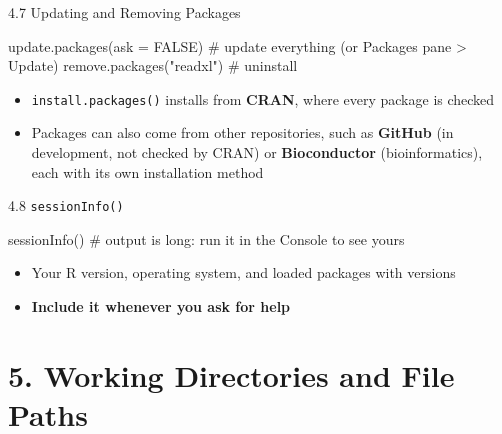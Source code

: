 \documentclass[
  ignorenonframetext,
  aspectratio=169,
]{beamer}
\newenvironment{Shaded}{\begin{snugshade}}{\end{snugshade}}
\newcommand{\AttributeTok}[1]{\textcolor[rgb]{0.40,0.45,0.13}{#1}}
\newcommand{\CommentTok}[1]{\textcolor[rgb]{0.37,0.37,0.37}{#1}}
\newcommand{\ConstantTok}[1]{\textcolor[rgb]{0.56,0.35,0.01}{#1}}
\newcommand{\FunctionTok}[1]{\textcolor[rgb]{0.28,0.35,0.67}{#1}}
\newcommand{\NormalTok}[1]{\textcolor[rgb]{0.00,0.23,0.31}{#1}}
\newcommand{\StringTok}[1]{\textcolor[rgb]{0.13,0.47,0.30}{#1}}
\providecommand{\tightlist}{%
  \setlength{\itemsep}{0pt}\setlength{\parskip}{0pt}}
\begin{document}
\begin{frame}[fragile]{4.7 Updating and Removing Packages}
\protect{}\label{updating-and-removing-packages}
\begin{Shaded}
\begin{Highlighting}[]
\FunctionTok{update.packages}\NormalTok{(}\AttributeTok{ask =} \ConstantTok{FALSE}\NormalTok{)   }\CommentTok{\# update everything (or Packages pane \textgreater{} Update)}
\FunctionTok{remove.packages}\NormalTok{(}\StringTok{"readxl"}\NormalTok{)      }\CommentTok{\# uninstall}
\end{Highlighting}
\end{Shaded}

\begin{itemize}
\tightlist
\item
  \texttt{install.packages()} installs from \textbf{CRAN}, where every
  package is checked
\item
  Packages can also come from other repositories, such as
  \textbf{GitHub} (in development, not checked by CRAN) or
  \textbf{Bioconductor} (bioinformatics), each with its own installation
  method
\end{itemize}
\end{frame}

\begin{frame}[fragile]{4.8 \texttt{sessionInfo()}}
\protect{}\label{sec-session-info}
\begin{Shaded}
\begin{Highlighting}[]
\FunctionTok{sessionInfo}\NormalTok{()      }\CommentTok{\# output is long: run it in the Console to see yours}
\end{Highlighting}
\end{Shaded}

\begin{itemize}
\tightlist
\item
  Your R version, operating system, and loaded packages with versions
\item
  \textbf{Include it whenever you ask for help}
\end{itemize}
\end{frame}

\section{5. Working Directories and File Paths}\label{sec-paths}
\end{document}
